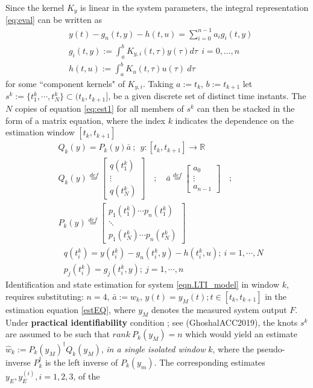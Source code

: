 \documentclass{article}
\begin{document}
Since the kernel $K_{y}$ is linear in the system parameters, the integral representation 
\eqref{eq:eval} can be written as
\begin{align}
& y(t) - g_n(t, y) -h(t,u) = \sum_{i=0}^{n-1} a_i  g_i (t, y)  \label{eq:est1} \\
&  g_i( t, y) := \int_a^b K_{y,i} (t,\tau) y(\tau) d \tau  \ \ i = 0, \dots, n \label{rep3} \\
& h(t,u) := \int_a^b K_{u}(t,\tau) u(\tau) \ d \tau \nonumber
\end{align}
for some ``component kernels" of $K_{y,i}$. Taking $a :=t_k$, $b := t_{k+1}$ let
 $s^k := \{t_1^k, \cdots , t_N^k \}  \subset (t_k,t_{k+1}]$, be a given discrete 
 set of distinct time instants. The $N$ copies of 
 equation \eqref{eq:est1} for all members of $s^k$ can then be stacked in the form of a matrix equation, where the index $k$ indicates the dependence on the estimation window $[t_k,t_{k+1}]$
 \begin{align} 
& Q_k(y) = P_k(y) \bar{a} \ ; \  \ y : [t_k,t_{k+1}] \rightarrow \mathbb{R}  \label{estEQ}
\nonumber \\
& Q_k (y)\stackrel{def}{=} \begin{bmatrix} q(t_1^k) \\ \vdots \\ q(t_N^k) \end{bmatrix} \quad ; \quad
\bar{a} \stackrel{def}{=} \begin{bmatrix} a_0 \\ \vdots \\ a_{n-1} \end{bmatrix} \quad ; \\
& P_k(y)  \stackrel{def}{=} \begin{bmatrix} p_1(t_1^k) \cdots p_n (t_1^k) \\ \ddots \\ p_1(t_N^k) \cdots p_n(t_N^k) \end{bmatrix}  \nonumber \\
& \ \ \ q(t_i^k) =  y(t_i^k) - g_n( t_i^k, y) -h(t_i^k,u) ; \ i= 1, \cdots , N \nonumber \\
&  \ \  \ p_j(t_i^k)=  g_j( t_i^k, y) ; \ j = 1, \cdots , n \label{eq:est3b}
\end{align}
Identification and state estimation for system \eqref{eqn.LTI_model} in window $k$, requires substituting: $n=4$, $\bar{a} := w_k$, $y(t) = y_M(t); t \in [t_k, t_{k+1}]$ in the estimation equation \eqref{estEQ}, where $y_M$ denotes the measured system output $F$. 
Under \textbf{practical identifiability} condition ; see (GhoshalACC2019), the knots $s^k$ are assumed to be such that  $rank \ P_k(y_M) =n$ which would yield an estimate $\hat{w}_k := P_k(y_M)^\dagger Q_k(y_M)$, {\it in a single isolated window} $k$, where the pseudo-inverse $P_k^\dagger$ is the left inverse of $P_k(y_m)$. The corresponding estimates $y_E, y_E^{(i)}, i=1,2,3$, of the
\end{document}
